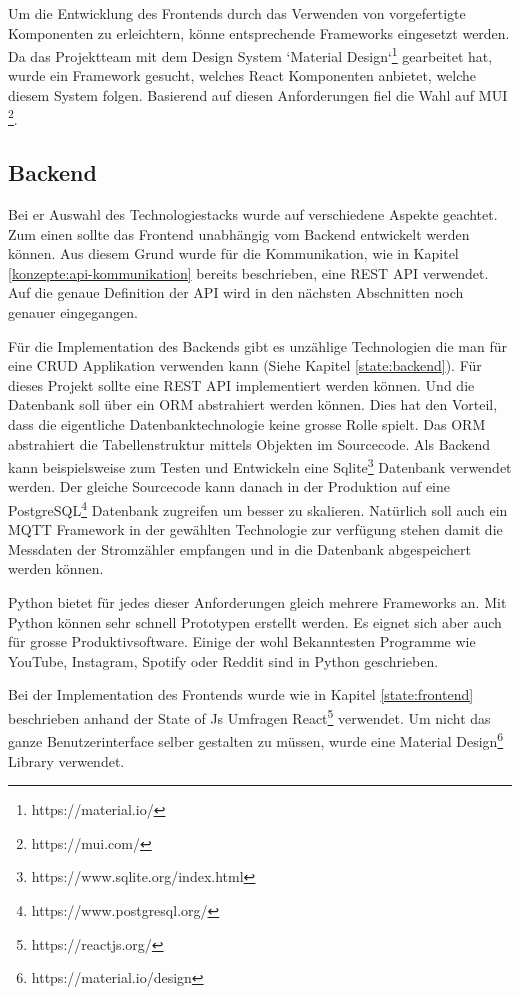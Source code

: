 Um die Entwicklung des Frontends durch das Verwenden von vorgefertigte Komponenten zu erleichtern, könne entsprechende Frameworks eingesetzt werden.
Da das Projektteam mit dem Design System `Material Design`\footnote{https://material.io/} gearbeitet hat,
wurde ein Framework gesucht, welches React Komponenten anbietet, welche diesem System folgen.
Basierend auf diesen Anforderungen fiel die Wahl auf MUI \footnote{https://mui.com/}.


\subsection{Backend}
Bei er Auswahl des Technologiestacks wurde auf verschiedene Aspekte geachtet.
Zum einen sollte das Frontend unabhängig vom Backend entwickelt werden können.
Aus diesem Grund wurde für die Kommunikation, wie in Kapitel \ref{konzepte:api-kommunikation}
bereits beschrieben, eine \ac{REST} \ac{API} verwendet.
Auf die genaue Definition der \ac{API} wird in den nächsten Abschnitten noch genauer eingegangen.

Für die Implementation des Backends gibt es unzählige Technologien die man für eine \ac{CRUD}
Applikation verwenden kann (Siehe Kapitel \ref{state:backend}). Für dieses Projekt sollte
eine \ac{REST} \ac{API} implementiert werden können. Und die Datenbank soll über ein \ac{ORM}
abstrahiert werden können. Dies hat den Vorteil, dass die eigentliche Datenbanktechnologie
keine grosse Rolle spielt. Das \ac{ORM} abstrahiert die Tabellenstruktur mittels
Objekten im Sourcecode. Als Backend kann beispielsweise zum Testen und Entwickeln
eine Sqlite\footnote{https://www.sqlite.org/index.html} Datenbank verwendet werden.
Der gleiche Sourcecode kann danach in der Produktion auf eine PostgreSQL\footnote{https://www.postgresql.org/}
Datenbank zugreifen um besser zu skalieren.
Natürlich soll auch ein \ac{MQTT} Framework in der gewählten Technologie zur verfügung stehen
damit die Messdaten der Stromzähler empfangen und in die Datenbank abgespeichert werden können.

Python bietet für jedes dieser Anforderungen gleich mehrere Frameworks an. Mit Python können sehr
schnell Prototypen erstellt werden. Es eignet sich aber auch für grosse Produktivsoftware.
Einige der wohl Bekanntesten Programme wie YouTube, Instagram, Spotify oder Reddit sind
in Python geschrieben. \cite{popular_python_sw}

Bei der Implementation des Frontends wurde wie in Kapitel \ref{state:frontend} beschrieben
anhand der State of Js Umfragen React\footnote{https://reactjs.org/} verwendet.
Um nicht das ganze Benutzerinterface selber gestalten zu müssen, wurde eine Material Design\footnote{https://material.io/design}
Library verwendet.

